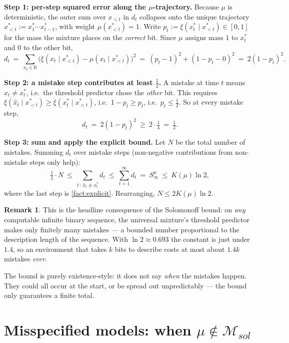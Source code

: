 \documentclass[fontsize=11pt, parskip=half]{scrartcl}
\theoremstyle{definition}
\newtheorem{remark}[theorem]{Remark}
\newenvironment{solution}{%
    \begin{tcolorbox}[colback=black!5!white, colframe=black!50!white,
      title={\textbf{Solution}}, fonttitle=\normalfont, breakable]
  }{\end{tcolorbox}}
\newenvironment{solution}{\expandafter\comment}{\expandafter\endcomment}
\newcommand{\Msol}{\mathcal{M}_{sol}}
\begin{document}
\begin{solution}
\textbf{Step 1: per-step squared error along the $\mu$-trajectory.}
Because $\mu$ is deterministic, the outer sum over $x_{<t}$ in $d_t$ collapses
onto the unique trajectory $x_{<t}^* := x_1^* \cdots x_{t-1}^*$, with weight
$\mu(x_{<t}^*) = 1$. Write $p_t := \xi(x_t^* \mid x_{<t}^*) \in [0,1]$ for the
mass the mixture places on the \emph{correct} bit. Since $\mu$ assigns mass $1$
to $x_t^*$ and $0$ to the other bit,
\[
  d_t ~=~ \sum_{x_t \in \mathbb{B}} \big(\xi(x_t \mid x_{<t}^*) - \mu(x_t \mid x_{<t}^*)\big)^2
  ~=~ (p_t - 1)^2 + (1 - p_t - 0)^2 ~=~ 2(1 - p_t)^2.
\]

\textbf{Step 2: a mistake step contributes at least $\tfrac12$.}
A mistake at time $t$ means $\hat{x}_t \neq x_t^*$, i.e.\ the threshold predictor
chose the \emph{other} bit. This requires
$\xi(\hat{x}_t \mid x_{<t}^*) \geq \xi(x_t^* \mid x_{<t}^*)$, i.e.\
$1 - p_t \geq p_t$, i.e.\ $p_t \leq \tfrac12$. So at every mistake step,
\[
  d_t ~=~ 2(1 - p_t)^2 ~\geq~ 2 \cdot \tfrac{1}{4} ~=~ \tfrac12.
\]

\textbf{Step 3: sum and apply the explicit bound.}
Let $N$ be the total number of mistakes. Summing $d_t$ over mistake steps
(non-negative contributions from non-mistake steps only help):
\[
  \tfrac12 \cdot N
  ~\leq~ \sum_{t \,:\, \hat{x}_t \neq x_t^*} d_t
  ~\leq~ \sum_{t=1}^\infty d_t ~=~ S^\mu_\infty
  ~\leq~ K(\mu) \ln 2,
\]
where the last step is \cref{fact:explicit}. Rearranging, $N \leq 2 K(\mu) \ln 2$.
\qedhere
\end{solution}

\begin{remark}
This is the headline consequence of the Solomonoff bound: on \emph{any}
computable infinite binary sequence, the universal mixture's threshold
predictor makes only finitely many mistakes --- a bounded number proportional
to the description length of the sequence. With $\ln 2 \approx 0.693$ the
constant is just under $1.4$, so an environment that takes $k$ bits to describe
costs at most about $1.4 k$ mistakes \emph{ever}.

The bound is purely existence-style: it does not say \emph{when} the mistakes
happen. They could all occur at the start, or be spread out unpredictably ---
the bound only guarantees a finite total.
\end{remark}

\section{Misspecified models: when $\mu \notin \Msol$}\label{prob:misspec}
\end{document}

